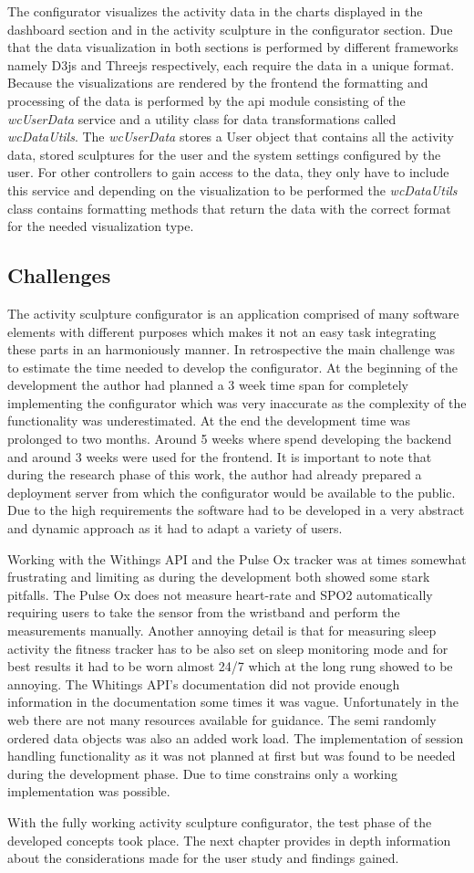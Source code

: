 \documentclass[../medieninformatik-arbeit.tex]{subfiles}
\begin{document}
The configurator visualizes the activity data in the charts displayed in the dashboard section and in the activity sculpture in the configurator section. Due that the data visualization in both sections is performed by different frameworks namely D3js and Threejs respectively, each require the data in a unique format. Because the visualizations are rendered by the frontend the formatting and processing of the data is performed by the api module consisting of the \textit{wcUserData} service and a utility class for data transformations called \textit{wcDataUtils}. The \textit{wcUserData} stores a User object that contains all the activity data, stored sculptures for the user and the system settings configured by the user. For other controllers to gain access to the data, they only have to include this service and depending on the visualization to be performed the \textit{wcDataUtils} class contains formatting methods that return the data with the correct format for the needed visualization type. 

\subsection{Challenges}
The activity sculpture configurator is an application comprised of many software elements with different purposes which makes it not an easy task integrating these parts in an harmoniously manner. In retrospective the main challenge was to estimate the time needed to develop the configurator. At the beginning of the development the author had planned a 3 week time span for completely implementing the configurator which was very inaccurate as the complexity of the functionality was underestimated. At the end the development time was prolonged to two months. Around 5 weeks where spend developing the backend and around 3 weeks were used for the frontend. It is important to note that during the research phase of this work, the author had already prepared a deployment server from which the configurator would be available to the public. Due to the high requirements the software had to be developed in a very abstract and dynamic approach as it had to adapt a variety of users. 

Working with the Withings API and the Pulse Ox tracker was at times somewhat frustrating and limiting as during the development both showed some stark pitfalls. The Pulse Ox does not measure heart-rate and SPO2 automatically requiring users to take the sensor from the wristband and perform the measurements manually. Another annoying detail is that for measuring sleep activity the fitness tracker has to be also set on sleep monitoring mode and for best results it had to be worn almost 24/7 which at the long rung showed to be annoying. The Whitings API's documentation did not provide enough information in the documentation some times it was vague. Unfortunately in the web there are not many resources available for guidance. The semi randomly ordered data objects was also an added work load. The implementation of session handling functionality as it was not planned at first but was found to be needed during the development phase. Due to time constrains only a working implementation was possible. 

With the fully working activity sculpture configurator, the test phase of the developed concepts took place. The next chapter provides in depth information about the considerations made for the user study and findings gained. 
\end{document}

